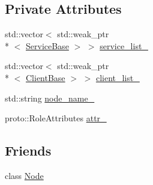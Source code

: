 \subsection*{Private Attributes}
\begin{DoxyCompactItemize}
\item 
std\-::vector$<$ std\-::weak\-\_\-ptr\\*
$<$ \hyperlink{classapollo_1_1cyber_1_1ServiceBase}{Service\-Base} $>$ $>$ \hyperlink{classapollo_1_1cyber_1_1NodeServiceImpl_a5c763412befbe5299c797e670d4be36d}{service\-\_\-list\-\_\-}
\item 
std\-::vector$<$ std\-::weak\-\_\-ptr\\*
$<$ \hyperlink{classapollo_1_1cyber_1_1ClientBase}{Client\-Base} $>$ $>$ \hyperlink{classapollo_1_1cyber_1_1NodeServiceImpl_a6b9e4bdf90743f8ae324ef1a44ed883f}{client\-\_\-list\-\_\-}
\item 
std\-::string \hyperlink{classapollo_1_1cyber_1_1NodeServiceImpl_a8f9533d4f5e1f460bd8ee0e76644c912}{node\-\_\-name\-\_\-}
\item 
proto\-::\-Role\-Attributes \hyperlink{classapollo_1_1cyber_1_1NodeServiceImpl_a762c2be3d310b7af1c0da1b83df54349}{attr\-\_\-}
\end{DoxyCompactItemize}
\subsection*{Friends}
\begin{DoxyCompactItemize}
\item 
class \hyperlink{classapollo_1_1cyber_1_1NodeServiceImpl_a6db9d28bd448a131448276ee03de1e6d}{Node}
\end{DoxyCompactItemize}


